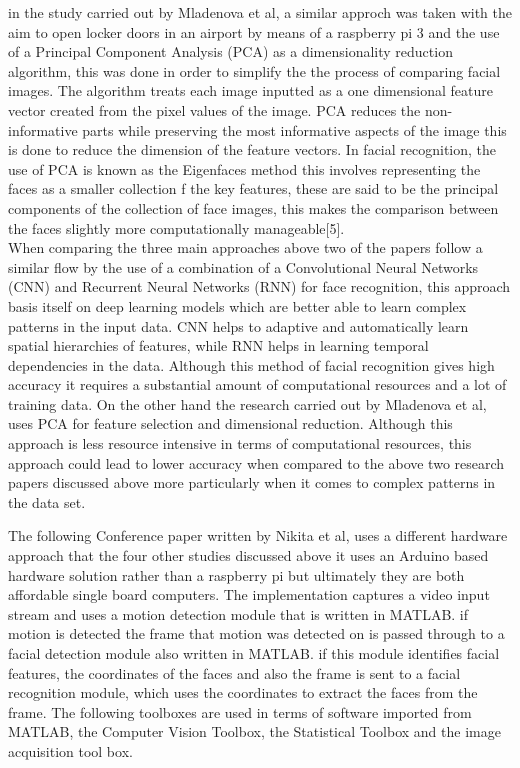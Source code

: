 \documentclass[journal]{IEEEtran}
\begin{document}
in the study carried out by Mladenova et al, a similar approch was taken with the aim to open locker doors in an airport by means of a raspberry pi 3 and the use of a Principal Component Analysis (PCA) as a dimensionality reduction algorithm, this was done in order to simplify the the process of comparing facial images. The algorithm treats each image inputted as a one dimensional feature vector created from the pixel values of the image. PCA reduces the non-informative parts while preserving the most informative aspects of the image this is done to reduce the dimension of the feature vectors. In facial recognition, the use of PCA is known as the Eigenfaces method this involves representing the faces as a smaller collection f the key features, these are said to be the principal components of the collection of face images, this makes the comparison between the faces slightly more computationally manageable[5].\\

When comparing the three main approaches above two of the papers follow a similar flow by the use of a combination of a Convolutional Neural Networks (CNN) and Recurrent Neural Networks (RNN) for face recognition, this approach basis itself on deep learning models which are better able to learn complex patterns in the input data. CNN helps to adaptive and automatically learn spatial hierarchies of features, while RNN helps in learning  temporal dependencies in the data. Although this method of facial recognition gives high accuracy it requires a substantial amount of computational resources and a lot of training data. On the other hand the research carried out by Mladenova et al, uses PCA for feature selection and dimensional reduction. Although this approach is less resource intensive in terms of computational resources, this approach could lead to lower accuracy when compared to the above two research papers discussed above more particularly when it comes to complex patterns in the data set.

The following Conference paper written by Nikita et al, uses a different hardware approach that the four other studies discussed above it uses an Arduino based hardware solution rather than a raspberry pi but ultimately they are both affordable single board computers. The implementation captures a video input stream and uses a motion detection module that is written in MATLAB. if motion is detected the frame that motion was detected on is passed through to a facial detection module also written in MATLAB. if this module identifies facial features, the coordinates of the faces and also the frame is sent to a facial recognition module, which uses the coordinates to extract the faces from the frame. The following toolboxes are used in terms of software imported from MATLAB, the Computer Vision Toolbox, the Statistical Toolbox and the image acquisition tool box.\\
\end{document}
